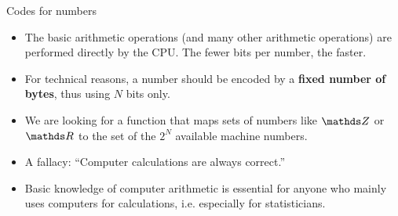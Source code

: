 








\begin{vbframe}{Codes for numbers}
\begin{itemize}


\item The basic arithmetic operations (and many other arithmetic operations)
  are performed directly by the CPU. The fewer bits per number,
  the faster.
\item For technical reasons, a number should be encoded by a
  \textbf{fixed number of bytes}, thus using $N$ bits only.
\item We are looking for a function that maps sets of numbers like $\Z$ or $\R$
   to the set of the $2^N$ available machine numbers.
\item A fallacy: \enquote{Computer calculations are always correct.}
\item Basic knowledge of computer arithmetic is essential for anyone who mainly uses computers for calculations, i.e. especially for statisticians.
\end{itemize}

\framebreak


\end{vbframe}
